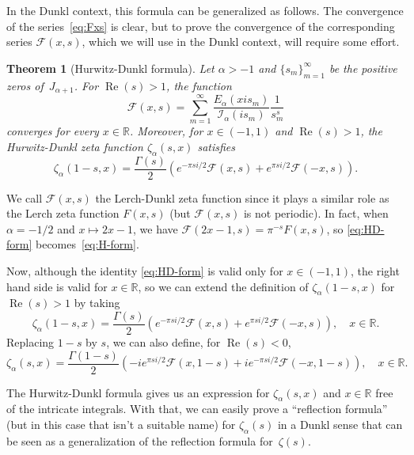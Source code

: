 \documentclass[a4paper]{amsart}
\newcommand{\R}{\mathbb{R}}
\newcommand{\I}{\mathcal{I}}
\newcommand{\Ea}{E_{\alpha}}
\renewcommand{\Re}{\operatorname{Re}}
\theoremstyle{plain}
\newtheorem{theorem}{Theorem}[section]
\theoremstyle{definition}
\theoremstyle{remark}
\numberwithin{equation}{section}
\begin{document}
In the Dunkl context, this formula can be generalized as follows. The convergence of the series~\eqref{eq:Fxs} is clear, but to prove the convergence of the corresponding series $\mathcal{F}(x,s)$, which we will use in the Dunkl context, will require some effort. 

\begin{theorem}[Hurwitz-Dunkl formula]
\label{teo:HD-form}
Let $\alpha>-1$ and $\{s_m\}_{m=1}^{\infty}$ be the positive zeros of~$J_{\alpha+1}$.
For $\Re(s)>1$, the function
\begin{equation}
\label{eq:HD-formF}
\mathcal{F}(x,s) = \sum_{m=1}^{\infty} 
\frac{\Ea(xi s_m)}{\I_{\alpha}(i s_m)} \frac{1}{s_m^s}
\end{equation}
converges for every $x \in \R$.
Moreover, for $x \in (-1,1)$ and $\Re(s)>1$, 
the Hurwitz-Dunkl zeta function $\zeta_\alpha(s,x)$ satisfies
\begin{equation}
\label{eq:HD-form}
\zeta_{\alpha}(1-s,x) = \frac{\Gamma(s)}{2}
\left(e^{-\pi s i/2} \mathcal{F}(x,s) + e^{\pi s i/2} \mathcal{F}(-x,s)\right).
\end{equation}
\end{theorem}

We call $\mathcal{F}(x,s)$ the Lerch-Dunkl zeta function since it plays a similar role as the Lerch zeta function $F(x,s)$ (but $\mathcal{F}(x,s)$ is not periodic). In fact, when $\alpha = -1/2$ and $x\mapsto 2x-1$, we have $\mathcal{F}(2x-1,s) = \pi^{-s}F(x,s)$, so \eqref{eq:HD-form} becomes~\eqref{eq:H-form}. 

Now, although the identity \eqref{eq:HD-form} is valid only for $x \in (-1,1)$, the right hand side is valid for $x \in \R$, so we can extend the definition of $\zeta_\alpha(1-s,x)$ for $\Re(s)>1$ by taking
\begin{equation}
\label{eq:HD-form-xR}
\zeta_{\alpha}(1-s,x) = \frac{\Gamma(s)}{2}
\left(e^{-\pi s i/2} \mathcal{F}(x,s) + e^{\pi s i/2} \mathcal{F}(-x,s)\right),
\quad x \in \R.
\end{equation}
Replacing $1-s$ by $s$, we can also define, for $\Re(s)<0$,
\[
\zeta_{\alpha}(s,x) = \frac{\Gamma(1-s)}{2}
\left({-}ie^{\pi s i/2} \mathcal{F}(x,1-s) + i e^{-\pi s i/2} \mathcal{F}(-x,1-s)\right),
\quad x \in \R.
\]

The Hurwitz-Dunkl formula gives us an expression for $\zeta_\alpha(s,x)$ and $x \in \R$ free of the intricate integrals. With that, we can easily prove a ``reflection formula'' (but in this case that isn't a suitable name) for $\zeta_\alpha(s)$ in a Dunkl sense that can be seen as a generalization of the reflection formula for~$\zeta(s)$. 
\end{document}
